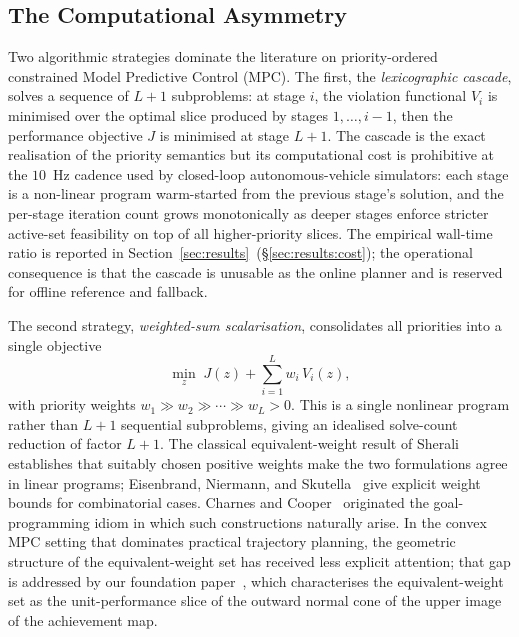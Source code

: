 \subsection{The Computational Asymmetry}
\label{sec:intro:asymmetry}

Two algorithmic strategies dominate the literature on priority-ordered constrained Model Predictive Control (MPC). The first, the \emph{lexicographic cascade}, solves a sequence of $L+1$ subproblems: at stage $i$, the violation functional $V_i$ is minimised over the optimal slice produced by stages $1, \ldots, i-1$, then the performance objective $J$ is minimised at stage $L+1$. The cascade is the exact realisation of the priority semantics but its computational cost is prohibitive at the $10$~Hz cadence used by closed-loop autonomous-vehicle simulators: each stage is a non-linear program warm-started from the previous stage's solution, and the per-stage iteration count grows monotonically as deeper stages enforce stricter active-set feasibility on top of all higher-priority slices. The empirical wall-time ratio is reported in Section~\ref{sec:results}~(\S\ref{sec:results:cost}); the operational consequence is that the cascade is unusable as the online planner and is reserved for offline reference and fallback.

The second strategy, \emph{weighted-sum scalarisation}, consolidates all priorities into a single objective
\begin{equation}
    \min_{z}\; J(z) + \sum_{i=1}^{L} w_i\, V_i(z),
    \label{eq:ws-scalarisation}
\end{equation}
with priority weights $w_1 \gg w_2 \gg \cdots \gg w_L > 0$. This is a single nonlinear program rather than $L+1$ sequential subproblems, giving an idealised solve-count reduction of factor $L+1$. The classical equivalent-weight result of Sherali~\cite{sherali1982equivalent} establishes that suitably chosen positive weights make the two formulations agree in linear programs; Eisenbrand, Niermann, and Skutella~\cite{eisenbrand2003lex} give explicit weight bounds for combinatorial cases. Charnes and Cooper~\cite{charnes1961goal} originated the goal-programming idiom in which such constructions naturally arise. In the convex MPC setting that dominates practical trajectory planning, the geometric structure of the equivalent-weight set has received less explicit attention; that gap is addressed by our foundation paper~\cite{lcp2025}, which characterises the equivalent-weight set as the unit-performance slice of the outward normal cone of the upper image of the achievement map.

